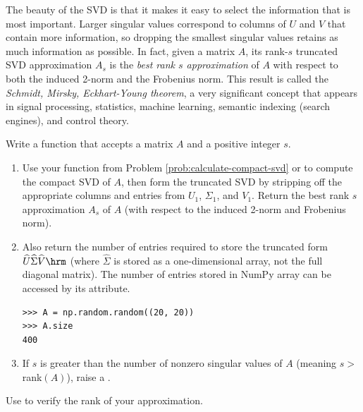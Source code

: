 The beauty of the SVD is that it makes it easy to select the information that is most important.
Larger singular values correspond to columns of $U$ and $V$ that contain more information, so dropping the smallest singular values retains as much information as possible.
In fact, given a matrix $A$, its rank-$s$ truncated SVD approximation $A_s$ is the \emph{best rank $s$ approximation} of $A$ with respect to both the induced 2-norm and the Frobenius norm.
This result is called the \emph{Schmidt, Mirsky, Eckhart-Young theorem}, a very significant concept that appears in signal processing, statistics, machine learning, semantic indexing (search engines), and control theory.

\begin{problem} %
Write a function that accepts a matrix $A$ and a positive integer $s$.
\begin{enumerate}
\item Use your function from Problem \ref{prob:calculate-compact-svd} or  to compute the compact SVD of $A$, then form the truncated SVD by stripping off the appropriate columns and entries from $U_1$, $\Sigma_1$, and $V_1$.
Return the best rank $s$ approximation $A_s$ of $A$ (with respect to the induced 2-norm and Frobenius norm).
\item Also return the number of entries required to store the truncated form $\widehat{U}\widehat{\Sigma} \widehat{V}\hrm$ (where $\widehat{\Sigma}$ is stored as a one-dimensional array, not the full diagonal matrix).
The number of entries stored in NumPy array can be accessed by its  attribute.
\begin{lstlisting}
>>> A = np.random.random((20, 20))
>>> A.size
400
\end{lstlisting}
\item If $s$ is greater than the number of nonzero singular values of $A$ (meaning $s > $ rank$(A)$), raise a .
\end{enumerate}
Use  to verify the rank of your approximation.
\label{prob:svd_approx}
\end{problem}

